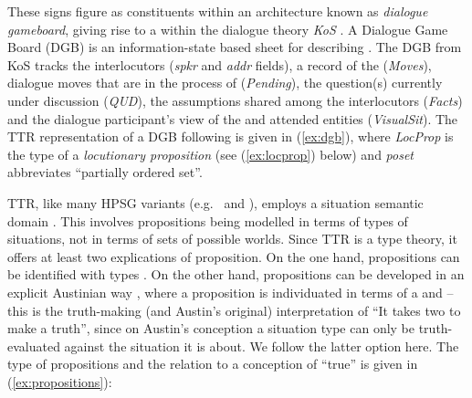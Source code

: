 \documentclass[output=paper
 	        ,biblatex
                ,babelshorthands
                ,newtxmath
                ,draftmode
                ,colorlinks, citecolor=brown
]{langscibook}
\begin{document}
These \HPSGTTR signs figure as constituents within an architecture known as \emph{dialogue gameboard}, giving rise to a  within the dialogue theory \emph{KoS}
\citep{Ginzburg:1994,Ginzburg:1996,Ginzburg:2003,Ginzburg:2012}. 
%
A Dialogue Game Board (DGB) is an information-state based sheet for describing .
%
The DGB from KoS tracks the interlocutors (\textit{spkr} and \textit{addr} fields), a record of the  (\textit{Moves}), dialogue moves that are in the process of  (\textit{Pending}), the question(s) currently under discussion (\textit{QUD}), the assumptions shared among the interlocutors (\textit{Facts}) and   the dialogue
participant's view of 
the  and attended entities (\textit{VisualSit}).
%
The TTR representation of a DGB following \citet{Ginzburg:2012} is given in (\ref{ex:dgb}), where \textit{LocProp} is the type of a \emph{locutionary proposition} (see (\ref{ex:locprop}) below) and \textit{poset} abbreviates \enquote{partially ordered set}.
%
\ea \label{ex:dgb}
\z


TTR, like many HPSG variants (e.g.\ \citealt{Pollard:Sag:1987} and \citealt{Pollard:Sag:1994}), employs a situation semantic domain \citep{Cooper:ms}.
%
This involves propositions being modelled in terms of types of situations, not in terms of sets of possible worlds.
%
Since TTR is a type theory, it offers at least two explications of proposition.
%
On the one hand, propositions can be identified with types \citep{Cooper:2005:b}.
%
On the other hand, propositions can be developed in an explicit Austinian way \citep{Austin:1950}, where a proposition is individuated in terms of a  and  \citep[]{Ginzburg:2011:a} -- this is the truth-making (and Austin's original) interpretation of \enquote{It takes two to make a truth}, since on Austin's conception a situation type can only be truth-evaluated against the situation it is about.
%
We follow the latter option here.
%
The type of propositions and the relation to a  conception of \enquote{true} \citep{Barwise:Perry:1983} is given in (\ref{ex:propositions}):
%
\ea \label{ex:propositions}
\ea 
{}
\ex 
{}
\z
\z
\end{document}
